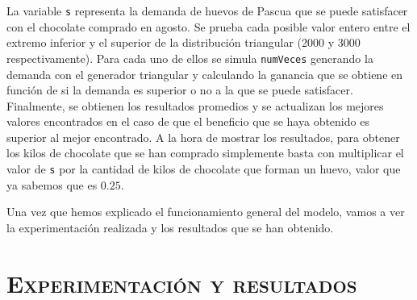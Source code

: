 \documentclass[11pt,a4paper]{article}
\begin{document}
La variable \texttt{s} representa la demanda de huevos de Pascua que se puede satisfacer con el chocolate
comprado en agosto. Se prueba cada posible valor entero entre el extremo inferior y el superior de la distribución
triangular (2000 y 3000 respectivamente). Para cada uno de ellos se simula \texttt{numVeces} generando la demanda
con el generador triangular y calculando la ganancia que se obtiene en función de si la demanda es
superior o no a la que se puede satisfacer. Finalmente, se obtienen los resultados promedios y se actualizan
los mejores valores encontrados en el caso de que el beneficio que se haya obtenido es superior al mejor
encontrado. A la hora de mostrar los resultados, para obtener los kilos de chocolate que se han comprado
simplemente basta con multiplicar el valor de \texttt{s} por la cantidad de kilos de chocolate que forman un
huevo, valor que ya sabemos que es $0.25$.

Una vez que hemos explicado el funcionamiento general del modelo, vamos a ver la experimentación
realizada y los resultados que se han obtenido.

\section{\textsc{Experimentación y resultados}}
\end{document}
